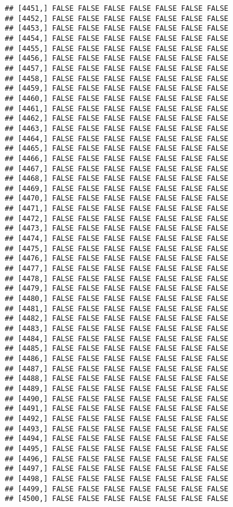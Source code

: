 \documentclass[
]{article}
\begin{document}
\begin{verbatim}
## [4451,] FALSE FALSE FALSE FALSE FALSE FALSE FALSE
## [4452,] FALSE FALSE FALSE FALSE FALSE FALSE FALSE
## [4453,] FALSE FALSE FALSE FALSE FALSE FALSE FALSE
## [4454,] FALSE FALSE FALSE FALSE FALSE FALSE FALSE
## [4455,] FALSE FALSE FALSE FALSE FALSE FALSE FALSE
## [4456,] FALSE FALSE FALSE FALSE FALSE FALSE FALSE
## [4457,] FALSE FALSE FALSE FALSE FALSE FALSE FALSE
## [4458,] FALSE FALSE FALSE FALSE FALSE FALSE FALSE
## [4459,] FALSE FALSE FALSE FALSE FALSE FALSE FALSE
## [4460,] FALSE FALSE FALSE FALSE FALSE FALSE FALSE
## [4461,] FALSE FALSE FALSE FALSE FALSE FALSE FALSE
## [4462,] FALSE FALSE FALSE FALSE FALSE FALSE FALSE
## [4463,] FALSE FALSE FALSE FALSE FALSE FALSE FALSE
## [4464,] FALSE FALSE FALSE FALSE FALSE FALSE FALSE
## [4465,] FALSE FALSE FALSE FALSE FALSE FALSE FALSE
## [4466,] FALSE FALSE FALSE FALSE FALSE FALSE FALSE
## [4467,] FALSE FALSE FALSE FALSE FALSE FALSE FALSE
## [4468,] FALSE FALSE FALSE FALSE FALSE FALSE FALSE
## [4469,] FALSE FALSE FALSE FALSE FALSE FALSE FALSE
## [4470,] FALSE FALSE FALSE FALSE FALSE FALSE FALSE
## [4471,] FALSE FALSE FALSE FALSE FALSE FALSE FALSE
## [4472,] FALSE FALSE FALSE FALSE FALSE FALSE FALSE
## [4473,] FALSE FALSE FALSE FALSE FALSE FALSE FALSE
## [4474,] FALSE FALSE FALSE FALSE FALSE FALSE FALSE
## [4475,] FALSE FALSE FALSE FALSE FALSE FALSE FALSE
## [4476,] FALSE FALSE FALSE FALSE FALSE FALSE FALSE
## [4477,] FALSE FALSE FALSE FALSE FALSE FALSE FALSE
## [4478,] FALSE FALSE FALSE FALSE FALSE FALSE FALSE
## [4479,] FALSE FALSE FALSE FALSE FALSE FALSE FALSE
## [4480,] FALSE FALSE FALSE FALSE FALSE FALSE FALSE
## [4481,] FALSE FALSE FALSE FALSE FALSE FALSE FALSE
## [4482,] FALSE FALSE FALSE FALSE FALSE FALSE FALSE
## [4483,] FALSE FALSE FALSE FALSE FALSE FALSE FALSE
## [4484,] FALSE FALSE FALSE FALSE FALSE FALSE FALSE
## [4485,] FALSE FALSE FALSE FALSE FALSE FALSE FALSE
## [4486,] FALSE FALSE FALSE FALSE FALSE FALSE FALSE
## [4487,] FALSE FALSE FALSE FALSE FALSE FALSE FALSE
## [4488,] FALSE FALSE FALSE FALSE FALSE FALSE FALSE
## [4489,] FALSE FALSE FALSE FALSE FALSE FALSE FALSE
## [4490,] FALSE FALSE FALSE FALSE FALSE FALSE FALSE
## [4491,] FALSE FALSE FALSE FALSE FALSE FALSE FALSE
## [4492,] FALSE FALSE FALSE FALSE FALSE FALSE FALSE
## [4493,] FALSE FALSE FALSE FALSE FALSE FALSE FALSE
## [4494,] FALSE FALSE FALSE FALSE FALSE FALSE FALSE
## [4495,] FALSE FALSE FALSE FALSE FALSE FALSE FALSE
## [4496,] FALSE FALSE FALSE FALSE FALSE FALSE FALSE
## [4497,] FALSE FALSE FALSE FALSE FALSE FALSE FALSE
## [4498,] FALSE FALSE FALSE FALSE FALSE FALSE FALSE
## [4499,] FALSE FALSE FALSE FALSE FALSE FALSE FALSE
## [4500,] FALSE FALSE FALSE FALSE FALSE FALSE FALSE

\end{verbatim}
\end{document}
